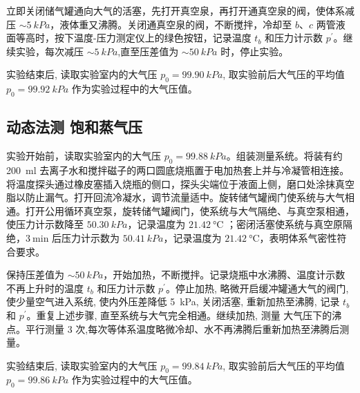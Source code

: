 立即关闭储气罐通向大气的活塞，先打开真空泉，再打开通真空泉的阀，使体系减压 \( \sim \SI{5}{kPa} \)，液体重又沸腾。关闭通真空泉的阀，不断搅拌，冷却至 \( b \)、\( c \) 两管液面等高时，按下温度-压力测定仪上的绿色按钮，记录温度 \( t_b \) 和压力计示数 \( p^\prime \)。继续实验，每次减压 \( \sim \SI{5}{kPa} \),直至压差值为 \( \sim \SI{50}{kPa} \) 时，停止实验。

实验结束后, 读取实验室内的大气压 \( p_0 = \SI{99.90}{kPa} \), 取实验前后大气压的平均值 \( p_0 = \SI{99.92}{kPa} \) 作为实验过程中的大气压值。

\subsection{动态法测  饱和蒸气压}

实验开始前，读取实验室内的大气压 \( p_0 = \SI{99.88}{kPa} \)。组装测量系统。将装有约 \SI{200}{\milli\litre} 去离子水和搅拌磁子的两口圆底烧瓶置于电加热套上并与冷凝管相连接。将温度探头通过橡皮塞插入烧瓶的侧口，探头尖端位于液面上侧，磨口处涂抹真空脂以防止漏气。打开回流冷凝水，调节流量适中。旋转储气罐阀门使系统与大气相通。打开公用循环真空泵，旋转储气罐阀门，使系统与大气隔绝、与真空泵相通，使压力计示数降至 \( \SI{50.30}{kPa} \)，记录温度为 \(\SI{21.42}{\celsius} \) ；密闭活塞使系统与真空原隔绝，\( \SI{3}{\minute} \) 后压力计示数为 \( \SI{50.41}{kPa} \)，记录温度为 \(\SI{21.42}{\celsius} \)，表明体系气密性符合要求。

保持压差值为 \( \sim \SI{50}{kPa} \)，开始加热，不断搅拌。记录烧瓶中水沸腾、温度计示数不再上升时的温度 \( t_b \) 和压力计示数 \( p^\prime \)。停止加热, 略微开启缓冲罐通大气的阀门, 使少量空气进入系统, 使内外压差降低 \SI{5}{kPa}, 关闭活塞, 重新加热至沸腾, 记录 \( t_b \) 和 \( p^\prime \)。重复上述步骤, 直至系统与大气完全相通。继续加热, 测量  大气压下的沸点。平行测量 3 次,每次等体系温度略微冷却、水不再沸腾后重新加热至沸腾后测量。

实验结束后, 读取实验室内的大气压 \( p_0 = \SI{99.84}{kPa} \), 取实验前后大气压的平均值 \( p_0 = \SI{99.86}{kPa} \) 作为实验过程中的大气压值。


